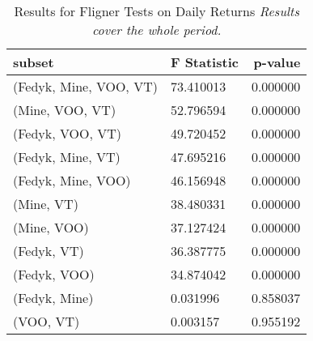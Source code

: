 \begin{appendices}
\begin{table}[ht]
\centering
\caption{Results for Fligner Tests on Daily Returns
\newline \footnotesize{\textit{Results cover the whole period.}}}
    \begin{tabular}{lll}
    \toprule
    \textbf{subset}        & \multicolumn{1}{r}{\textbf{F Statistic}} & \multicolumn{1}{r}{\textbf{p-value}} \\ \midrule
    (Fedyk, Mine, VOO, VT)              & 73.410013                      & 0.000000                       \\
    (Mine, VOO, VT)                     & 52.796594                      & 0.000000                       \\
    (Fedyk, VOO, VT)                    & 49.720452                      & 0.000000                       \\
    (Fedyk, Mine, VT)                   & 47.695216                      & 0.000000                       \\
    (Fedyk, Mine, VOO)                  & 46.156948                      & 0.000000                       \\
    (Mine, VT)                          & 38.480331                      & 0.000000                       \\
    (Mine, VOO)                         & 37.127424                      & 0.000000                       \\
    (Fedyk, VT)                         & 36.387775                      & 0.000000                       \\
    (Fedyk, VOO)                        & 34.874042                      & 0.000000                       \\
    (Fedyk, Mine)                       & 0.031996                       & 0.858037                       \\
    (VOO, VT)                           & 0.003157                       & 0.955192                      
    \end{tabular}
\label{tab:fligner_all}
\end{table}


\end{appendices}
